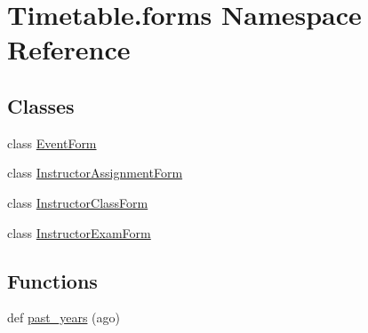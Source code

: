 \hypertarget{namespaceTimetable_1_1forms}{}\section{Timetable.\+forms Namespace Reference}
\label{namespaceTimetable_1_1forms}
\subsection*{Classes}
\begin{DoxyCompactItemize}
\item 
class \hyperlink{classTimetable_1_1forms_1_1EventForm}{Event\+Form}
\item 
class \hyperlink{classTimetable_1_1forms_1_1InstructorAssignmentForm}{Instructor\+Assignment\+Form}
\item 
class \hyperlink{classTimetable_1_1forms_1_1InstructorClassForm}{Instructor\+Class\+Form}
\item 
class \hyperlink{classTimetable_1_1forms_1_1InstructorExamForm}{Instructor\+Exam\+Form}
\end{DoxyCompactItemize}
\subsection*{Functions}
\begin{DoxyCompactItemize}
\item 
def \hyperlink{namespaceTimetable_1_1forms_a4af0bb23874a094ad7dd2dc09f924c42}{past\+\_\+years} (ago)
\end{DoxyCompactItemize}

